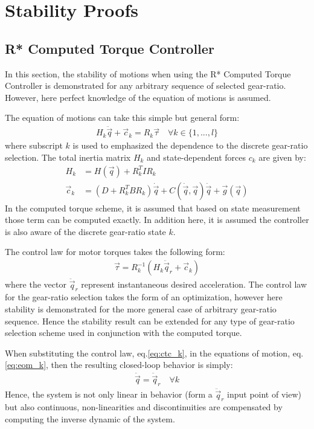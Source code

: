 \newpage
\section{Stability Proofs}
\label{sec:stabproofs}

 
\subsection{R* Computed Torque Controller}
\label{sec:stabrstar1}

In this section, the stability of motions when using the R* Computed Torque Controller is demonstrated for any arbitrary sequence of selected gear-ratio. However, here perfect knowledge of the equation of motions is assumed.

The equation of motions can take this simple but general form:
\begin{align}
H_k \ddot{\vec{q}} + \vec{c}_k = R_k \vec{\tau} \quad \forall k \in \{1,...,l\}
\label{eq:eom_k}
\end{align}
where subscript $k$ is used to emphasized the dependence to the discrete gear-ratio selection. The total inertia matrix $H_k$ and state-dependent forces $c_k$ are given by:
\begin{align}
H_k       &= H(\vec{q}) + R_k^T I R_k \\
\vec{c}_k &= \left( D + R_k^T B R_k \right) \dot{\vec{q}} + C( \dot{\vec{q}} , \vec{q} ) \dot{\vec{q}} + \vec{g}(\vec{q})
\end{align}
In the computed torque scheme, it is assumed that based on state measurement those term can be computed exactly. In addition here, it is assumed the controller is also aware of the discrete gear-ratio state $k$.

The control law for motor torques takes the following form:
\begin{align}
\vec{\tau} = R_k^{-1} \left( H_k \ddot{\vec{q}}_r + \vec{c}_k \right) 
\label{eq:ctc_k}
\end{align}
where the vector $\ddot{\vec{q}}_r$ represent instantaneous desired acceleration. The control law for the gear-ratio selection takes the form of an optimization, however here stability is demonstrated for the more general case of arbitrary gear-ratio sequence. Hence the stability result can be extended for any type of gear-ratio selection scheme used in conjunction with the computed torque. 

When substituting the control law, eq.\eqref{eq:ctc_k}, in the equations of motion, eq.\eqref{eq:eom_k}, then the resulting closed-loop behavior is simply:
\begin{align}
\ddot{\vec{q}} = \ddot{\vec{q}}_r \quad \forall k
\label{eq:cl_k}
\end{align}
Hence, the system is not only linear in behavior (form a $\ddot{\vec{q}}_r$ input point of view) but also continuous, non-linearities and discontinuities are compensated by computing the inverse dynamic of the system.

